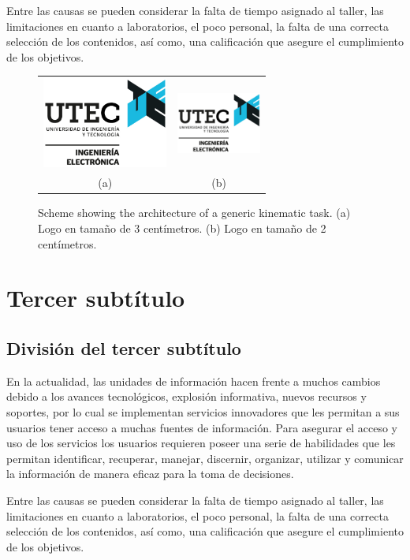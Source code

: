 Entre las causas se pueden considerar la falta de tiempo asignado al taller,
las limitaciones en cuanto a laboratorios, el poco personal, la falta de una
correcta selección de los contenidos, así como, una calificación que asegure el
cumplimiento de los objetivos.


\begin{figure} 
\begin{center}
\begin{tabular}{cc}
\includegraphics[height=3cm]{./images/ELECTRONICA} &
\includegraphics[height=2cm]{./images/ELECTRONICA} \\
(a) & (b)
\end{tabular}
\caption{\label{fig:diagram2}Scheme showing the architecture of a generic kinematic task. (a) Logo en tamaño de 3 centímetros. (b) Logo en tamaño de 2 centímetros.}
\end{center}
\end{figure}


\section{Tercer subtítulo}

\subsection{División del tercer subtítulo}

En la actualidad, las unidades de información hacen frente a muchos cambios
debido a los avances tecnológicos, explosión informativa, nuevos recursos y
soportes, por lo cual se implementan servicios innovadores que les permitan a
sus usuarios tener acceso a muchas fuentes de información. Para asegurar el
acceso y uso de los servicios los usuarios requieren poseer una serie de
habilidades que les permitan identificar, recuperar, manejar, discernir,
organizar, utilizar y comunicar la información de manera eficaz para la toma de
decisiones.

Entre las causas se pueden considerar la falta de tiempo asignado al taller,
las limitaciones en cuanto a laboratorios, el poco personal, la falta de una
correcta selección de los contenidos, así como, una calificación que asegure el
cumplimiento de los objetivos.

